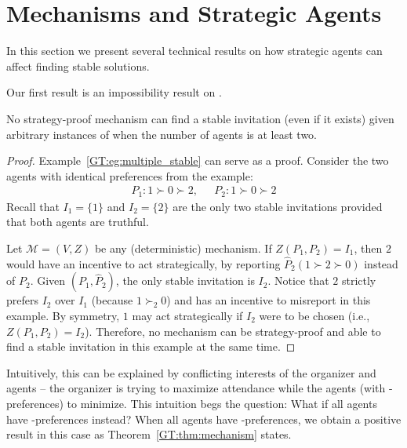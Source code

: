 \section{Mechanisms and Strategic Agents} \label{GT:sec:Mechanism}
In this section we present several technical results on how strategic agents can affect finding stable solutions.

Our first result is an impossibility result on \AOIP.

\begin{theorem} \label{GT:thm:impossibility}
No strategy-proof mechanism can find a stable invitation (even if it exists) given arbitrary instances of \AOIPs when the number of agents is at least two.
\end{theorem}
\begin{proof}
Example~\ref{GT:eg:multiple_stable} can serve as a proof. Consider the two agents with identical preferences from the example:
	\begin{equation*}
		\begin{aligned}
				P_1: 1 \succ 0 \succ 2,~~~& P_2: 1 \succ 0 \succ 2
		\end{aligned}
	\end{equation*}
	Recall that $I_1 = \{1\}$ and $I_2 =\{2\}$ are the only two stable invitations provided that both agents are truthful.

	Let $\mathcal{M} = (V, Z)$ be any (deterministic) mechanism.
	If $Z(P_1, P_2) = I_1$, then $2$ would have an incentive to act strategically, by reporting $\hat{P}_2 (1 \succ 2 \succ 0)$ instead of $P_2$. 
	Given $(P_1, \hat{P}_2)$, the only stable invitation is $I_2$.
	Notice that $2$ strictly prefers $I_2$ over $I_1$ (because $1 \succ_2 0$) and has an incentive to misreport in this example. By symmetry, $1$ may act strategically if $I_2$ were to be chosen (i.e., $Z(P_1, P_2) = I_2$).
	Therefore, no mechanism can be strategy-proof and able to find a stable invitation in this example at the same time.
\end{proof}

Intuitively, this can be explained by conflicting interests of the organizer and agents -- the organizer is trying to maximize attendance while the agents (with \DEC-preferences) to minimize. 
This intuition begs the question: What if all agents have \INC-preferences instead? 
When all agents have \INC-preferences, we obtain a positive result in this case as Theorem~\ref{GT:thm:mechanism} states. 

